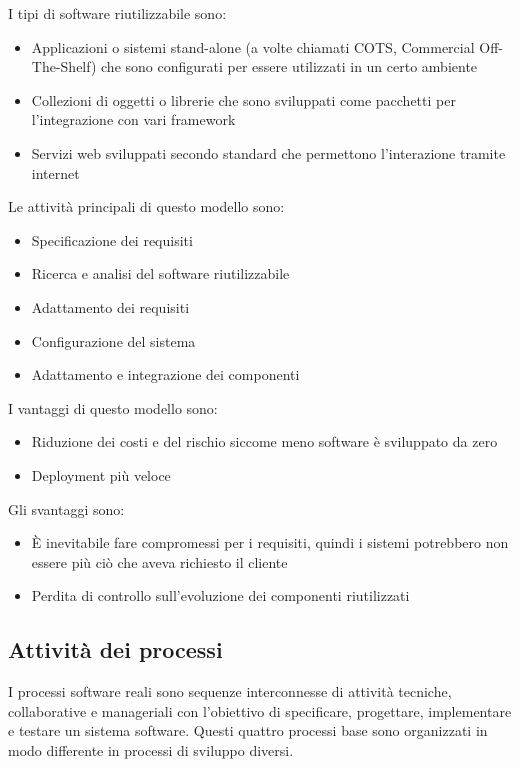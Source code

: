 \documentclass[a4paper]{article}
\begin{document}
I tipi di software riutilizzabile sono:
\begin{itemize}
  \item Applicazioni o sistemi stand-alone (a volte chiamati COTS, Commercial Off-The-Shelf)
    che sono configurati per essere utilizzati in un certo ambiente
    
  \item Collezioni di oggetti o librerie che sono sviluppati come pacchetti per 
    l'integrazione con vari framework

  \item Servizi web sviluppati secondo standard che permettono l'interazione tramite
    internet
\end{itemize}
Le attività principali di questo modello sono:
\begin{itemize}
  \item Specificazione dei requisiti
  \item Ricerca e analisi del software riutilizzabile
  \item Adattamento dei requisiti
  \item Configurazione del sistema
  \item Adattamento e integrazione dei componenti
\end{itemize}
I vantaggi di questo modello sono:
\begin{itemize}
  \item Riduzione dei costi e del rischio siccome meno software è sviluppato da zero
    
  \item Deployment più veloce
\end{itemize}
Gli svantaggi sono:
\begin{itemize}
  \item È inevitabile fare compromessi per i requisiti, quindi i sistemi potrebbero non
    essere più ciò che aveva richiesto il cliente

  \item Perdita di controllo sull'evoluzione dei componenti riutilizzati
\end{itemize}

\subsection{Attività dei processi}
I processi software reali sono sequenze interconnesse di attività tecniche, collaborative
e manageriali con l'obiettivo di specificare, progettare, implementare e testare un
sistema software. Questi quattro processi base sono organizzati in modo differente
in processi di sviluppo diversi.
\end{document}

